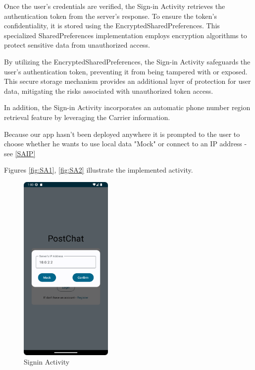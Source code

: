 Once the user's credentials are verified, the Sign-in Activity retrieves the authentication token from the server's response. To ensure the token's confidentiality, it is stored using the EncryptedSharedPreferences. This specialized SharedPreferences implementation employs encryption algorithms to protect sensitive data from unauthorized access.

By utilizing the EncryptedSharedPreferences, the Sign-in Activity safeguards the user's authentication token, preventing it from being tampered with or exposed. This secure storage mechanism provides an additional layer of protection for user data, mitigating the risks associated with unauthorized token access.


In addition, the Sign-in Activity incorporates an automatic phone number region retrieval feature by leveraging the Carrier information.

Because our app hasn't been deployed anywhere it is prompted to the user to choose whether he wants to use local data "Mock" or connect to an IP address - see \ref{SAIP}

Figures \ref{fig:SA1}, \ref{fig:SA2} illustrate the implemented activity.

\begin{figure}[!ht]
	\centering
	\includegraphics[trim={0cm -3cm 0 -3cm}, width=0.4\textwidth]{./Chapter6/Figures/SignInActivityIpAdress}
	\caption{Signin Activity}
	\label{fig:SAIP}
\end{figure}


